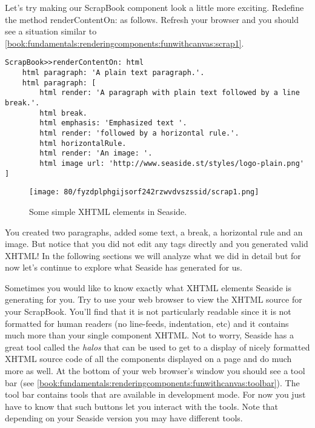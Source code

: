 \documentclass[a4paper,10pt,twoside]{book}
\newcommand{\ct}[1]{{\small\ttfamily\textup{#1}}}
\begin{document}
Let's try making our \ct{ScrapBook} component look a little more exciting. Redefine the method \ct{renderContentOn:} as follows. Refresh your browser and you should see a situation similar to \autoref{book:fundamentals:renderingcomponents:funwithcanvas:scrap1}.

\begin{lstlisting}
ScrapBook>>renderContentOn: html
    html paragraph: 'A plain text paragraph.'.
    html paragraph: [
        html render: 'A paragraph with plain text followed by a line break.'.
        html break.
        html emphasis: 'Emphasized text '.
        html render: 'followed by a horizontal rule.'.
        html horizontalRule.
        html render: 'An image: '.
        html image url: 'http://www.seaside.st/styles/logo-plain.png' ]
\end{lstlisting}

\begin{figure}[h!tbp]
	\begin{center}
		\texttt{[image: 80/fyzdplphgijsorf242rzwvdvszssid/scrap1.png]}
		\caption{Some simple XHTML elements in Seaside.\label{book:fundamentals:renderingcomponents:funwithcanvas:scrap1}}
	\end{center}
\end{figure}


You created two paragraphs, added some text, a break, a horizontal rule and an image. But notice that you did not edit any tags directly and you generated valid XHTML! In the following sections we will analyze what we did in detail but for now let's continue to explore what Seaside has generated for us.

Sometimes you would like to know exactly what XHTML elements Seaside is generating for you. Try to use your web browser to view the XHTML source for your \ct{ScrapBook}. You'll find that it is not particularly readable since it is not formatted for human readers (no line-feeds, indentation, etc) and it contains much more than your single component XHTML. Not to worry, Seaside has a great tool called the \textit{halos} that can be used to get to a display of nicely formatted XHTML source code of all the components displayed on a page and do much more as well. At the bottom of your web browser's window you should see a tool bar (see \autoref{book:fundamentals:renderingcomponents:funwithcanvas:toolbar}). The tool bar contains tools that are available in development mode. For now you just have to know that such buttons let you interact with the tools. Note that depending on your Seaside version you may have different tools.
\end{document}
